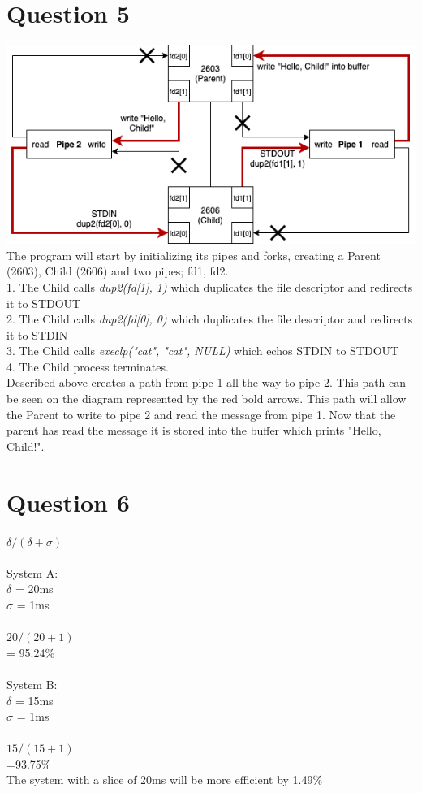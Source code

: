 \documentclass[11pt]{article}
\begin{document}
\newpage
\section*{Question 5}
\includegraphics[scale=0.6]{COMS352HW2Q5.png}\\
The program will start by initializing its pipes and forks, creating
a Parent (2603), Child (2606) and two pipes; fd1, fd2.\\
1. The Child calls \emph{dup2(fd[1], 1)} which duplicates the file descriptor
and redirects it to STDOUT\\
2. The Child calls \emph{dup2(fd[0], 0)} which duplicates the file descriptor
and redirects it to STDIN\\
3. The Child calls \emph{execlp("cat", "cat", NULL)} which echos STDIN to 
STDOUT\\
4. The Child process terminates. \\
Described above creates a path from pipe 1 all the way to pipe 2. 
This path can be seen on the diagram represented by the red bold arrows.
This path will allow the Parent to write to pipe 2 and read the message
from pipe 1. Now that the parent has read the message it is stored into
the buffer which prints "Hello, Child!".

\newpage
\section*{Question 6}
    $\delta / (\delta + \sigma)$\\\\
    System A:\\
    $\delta$ = 20ms\\
    $\sigma$ = 1ms\\\\
    $20 / (20 + 1)$\\
    = 95.24\%\\\\
    System B:\\
    $\delta$ = 15ms\\
    $\sigma$ = 1ms\\\\
    $15 / (15 + 1)$\\
    =93.75\%\\
    The system with a slice of 20ms will be more efficient by 1.49\%
\end{document}
